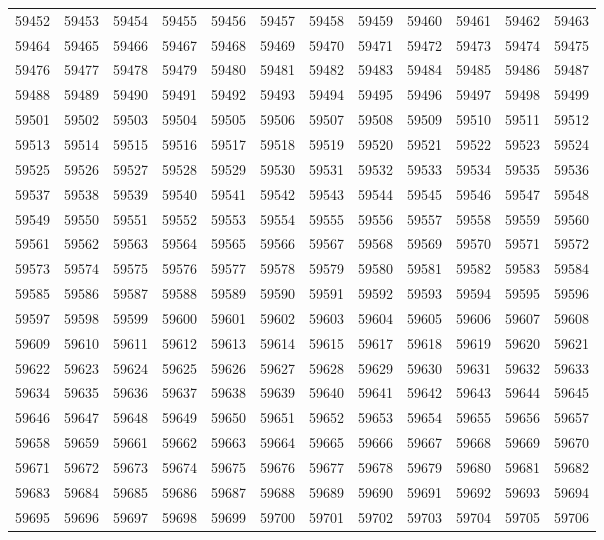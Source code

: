\begin{center}
\begin{longtable}{llllllllllll}
59452 &59453 &59454 &59455 &59456 &59457 &59458 &59459 &59460 &59461 &59462 &59463 \\
59464 &59465 &59466 &59467 &59468 &59469 &59470 &59471 &59472 &59473 &59474 &59475 \\
59476 &59477 &59478 &59479 &59480 &59481 &59482 &59483 &59484 &59485 &59486 &59487 \\
59488 &59489 &59490 &59491 &59492 &59493 &59494 &59495 &59496 &59497 &59498 &59499 \\
59501 &59502 &59503 &59504 &59505 &59506 &59507 &59508 &59509 &59510 &59511 &59512 \\
59513 &59514 &59515 &59516 &59517 &59518 &59519 &59520 &59521 &59522 &59523 &59524 \\
59525 &59526 &59527 &59528 &59529 &59530 &59531 &59532 &59533 &59534 &59535 &59536 \\
59537 &59538 &59539 &59540 &59541 &59542 &59543 &59544 &59545 &59546 &59547 &59548 \\
59549 &59550 &59551 &59552 &59553 &59554 &59555 &59556 &59557 &59558 &59559 &59560 \\
59561 &59562 &59563 &59564 &59565 &59566 &59567 &59568 &59569 &59570 &59571 &59572 \\
59573 &59574 &59575 &59576 &59577 &59578 &59579 &59580 &59581 &59582 &59583 &59584 \\
59585 &59586 &59587 &59588 &59589 &59590 &59591 &59592 &59593 &59594 &59595 &59596 \\
59597 &59598 &59599 &59600 &59601 &59602 &59603 &59604 &59605 &59606 &59607 &59608 \\
59609 &59610 &59611 &59612 &59613 &59614 &59615 &59617 &59618 &59619 &59620 &59621 \\
59622 &59623 &59624 &59625 &59626 &59627 &59628 &59629 &59630 &59631 &59632 &59633 \\
59634 &59635 &59636 &59637 &59638 &59639 &59640 &59641 &59642 &59643 &59644 &59645 \\
59646 &59647 &59648 &59649 &59650 &59651 &59652 &59653 &59654 &59655 &59656 &59657 \\
59658 &59659 &59661 &59662 &59663 &59664 &59665 &59666 &59667 &59668 &59669 &59670 \\
59671 &59672 &59673 &59674 &59675 &59676 &59677 &59678 &59679 &59680 &59681 &59682 \\
59683 &59684 &59685 &59686 &59687 &59688 &59689 &59690 &59691 &59692 &59693 &59694 \\
59695 &59696 &59697 &59698 &59699 &59700 &59701 &59702 &59703 &59704 &59705 &59706 \\

\end{longtable}
\end{center}
